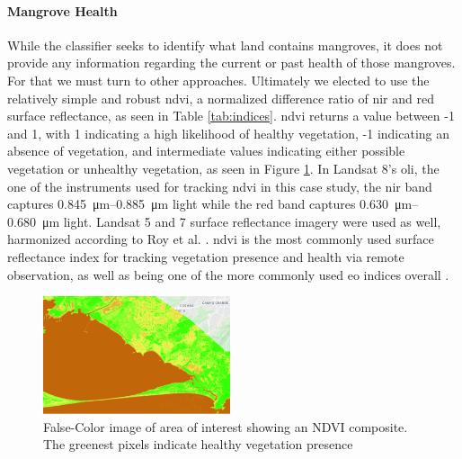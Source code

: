 \paragraph{Mangrove Health} \label{sec:rio-mangrove-health} \leavevmode\newline

While the classifier seeks to identify what land contains mangroves, it does not provide any information regarding the current or past health of those mangroves. For that we must turn to other approaches. Ultimately we elected to use the relatively simple and robust \ac{ndvi}, a normalized difference ratio of \ac{nir} and red surface reflectance, as seen in Table \ref{tab:indices}. \ac{ndvi} returns a value between -1 and 1, with 1 indicating a high likelihood of healthy vegetation, -1 indicating an absence of vegetation, and intermediate values indicating either possible vegetation or unhealthy vegetation, as seen in Figure \ref{fig:gndvi}. In Landsat 8's \ac{oli}, the one of the instruments used for tracking \ac{ndvi} in this case study, the \ac{nir} band captures \SIrange{0.845}{0.885}{\micro\metre} light while the red band captures \SIrange{0.630}{0.680}{\micro\metre} light. Landsat 5 and 7 surface reflectance imagery were used as well, harmonized according to Roy et al. \cite{royCharacterizationLandsat7Landsat82016}. \ac{ndvi} is the most commonly used surface reflectance index for tracking vegetation presence and health via remote observation, as well as being one of the more commonly used \ac{eo} indices overall \cite{fredenMonitoringVegetationSystems1974,haboudaneHyperspectralVegetationIndices2004, pettorelliUsingSatellitederivedNDVI2005}. 

\begin{figure}[H] 
\centering
\includegraphics[width=0.49\textwidth]{Figures/chap4/guaratiba_ndvi.png}
\caption[False-Color image of area of interest showing an NDVI composite]{False-Color image of area of interest showing an NDVI composite. The greenest pixels indicate healthy vegetation presence}
\label{fig:gndvi}
\end{figure}

